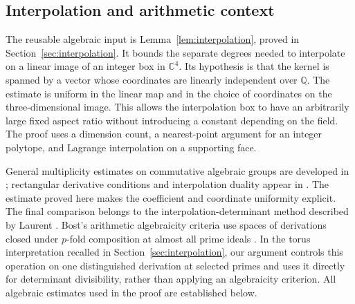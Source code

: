 \documentclass[11pt,a4paper]{amsart}
\theoremstyle{remark}
\newcommand{\Q}{\mathbb Q}
\newcommand{\C}{\mathbb C}
\numberwithin{equation}{section}
\begin{document}
\subsection*{Interpolation and arithmetic context}
The reusable algebraic input is Lemma~\ref{lem:interpolation}, proved
in Section~\ref{sec:interpolation}. It bounds the separate degrees
needed to interpolate on a linear image of an integer box in $\C^4$.
Its hypothesis is that the kernel is spanned by a vector whose
coordinates are linearly independent over $\Q$. The estimate is uniform in the linear
map and in the choice of coordinates on the three-dimensional image.
This allows the interpolation box to have an arbitrarily large fixed
aspect ratio without introducing a constant depending on the field.
The proof uses a dimension count, a nearest-point argument for an
integer polytope, and Lagrange interpolation on a supporting face.

General multiplicity estimates on commutative algebraic groups are
developed in \cite{Philippon}; rectangular derivative conditions
and interpolation duality appear in
\cite[Theorem~1.1 and Lemma~1.3]{Fischler}. The estimate proved here
makes the coefficient and coordinate uniformity explicit. The final
comparison belongs to the interpolation-determinant method described
by Laurent \cite[Section~6]{Laurent}. Bost's arithmetic algebraicity
criteria use spaces of derivations closed under $p$-fold composition
at almost all prime ideals \cite[Theorems~2.1 and 2.3]{Bost}.
In the torus interpretation recalled in Section~\ref{sec:interpolation},
our argument controls this operation on one distinguished derivation
at selected primes and uses it directly for determinant divisibility,
rather than applying an algebraicity criterion. All algebraic estimates
used in the proof are established below.
\end{document}
